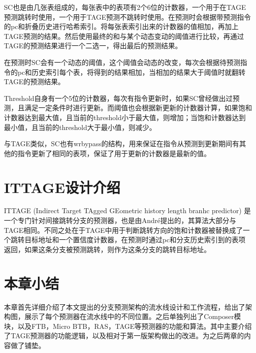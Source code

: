SC也是由几张表组成的，每张表中的表项有2个6位的计数器，一个用于在TAGE预测跳转时使用，一个用于TAGE预测不跳转时使用。在预测时会根据带预测指令的pc和折叠历史进行哈希索引。将每张表索引出来的计数器的值相加，再加上TAGE预测的结果。然后使用最终的和与某个动态变动的阈值进行比较，再通过TAGE的预测结果进行一个二选一，得出最后的预测结果。

在预测时SC会有一个动态的阈值，这个阈值会动态的改变，每次会根据待预测指令的pc和历史索引每个表，将得到的结果相加，当相加的结果大于阈值时就翻转TAGE的预测结果。

Threshold自身有一个5位的计数器，每次有指令更新时，如果SC曾经做出过预测，且满足一定条件时进行更新。而阈值也会根据新更新的计数器计算，如果饱和计数器达到最大值，且当前的threshold小于最大值，则增加；当饱和计数器达到最小值，且当前的threshold大于最小值，则减少。


与TAGE类似，SC也有wrbypass的结构，用来保证在指令从预测到更新期间有其他的指令更新了相同的表项，保证了用于更新的计数器是最新的值。


\section{ITTAGE设计介绍}

ITTAGE (Indirect Target TAgged GEometric history length branhc predictor)\cite{tage, ittage} 是一个专门针对间接跳转分支的预测器，也是由André提出的，其算法大部分与TAGE相同。不同之处在于TAGE中用于判断跳转方向的饱和计数器被替换成了一个跳转目标地址和一个置信度计数器，在预测时通过pc和分支历史索引到的表项返回，如果这条分支被预测跳转，则作为这条分支的跳转目标地址。

\section{本章小结}

本章首先详细介绍了本文提出的分支预测架构的流水线设计和工作流程，给出了架构图，展示了每个预测器在流水线中的不同位置。之后单独列出了Composer模块，以及FTB，Micro BTB，RAS，TAGE等预测器的功能和算法。其中主要介绍了TAGE预测器的功能逻辑，以及相对于第一版架构做出的改进。为之后两章的内容做了铺垫。